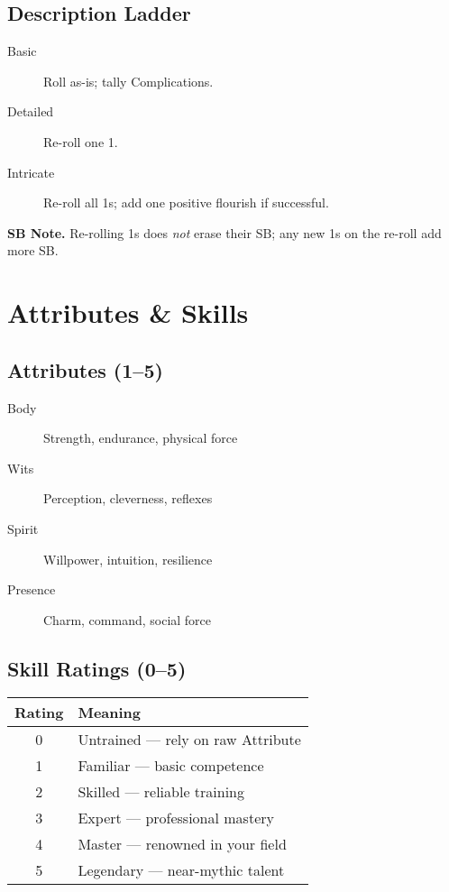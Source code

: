 \subsection*{Description Ladder}
\begin{description}
  \item[Basic] Roll as-is; tally Complications.
  \item[Detailed] Re-roll one 1.
  \item[Intricate] Re-roll all 1s; add one positive flourish if successful.
\end{description}

\noindent\textbf{SB Note.} Re-rolling 1s does \emph{not} erase their SB; any new 1s on the re-roll add more SB.

\section{Attributes \& Skills}

\subsection*{Attributes (1–5)}
\begin{description}
  \item[Body] Strength, endurance, physical force
  \item[Wits] Perception, cleverness, reflexes
  \item[Spirit] Willpower, intuition, resilience
  \item[Presence] Charm, command, social force
\end{description}

\subsection*{Skill Ratings (0–5)}
\begin{center}
\begin{tabular}{cl}
\toprule
\textbf{Rating} & \textbf{Meaning} \\
\midrule
0 & Untrained — rely on raw Attribute \\
1 & Familiar — basic competence \\
2 & Skilled — reliable training \\
3 & Expert — professional mastery \\
4 & Master — renowned in your field \\
5 & Legendary — near-mythic talent \\
\bottomrule
\end{tabular}
\end{center}

